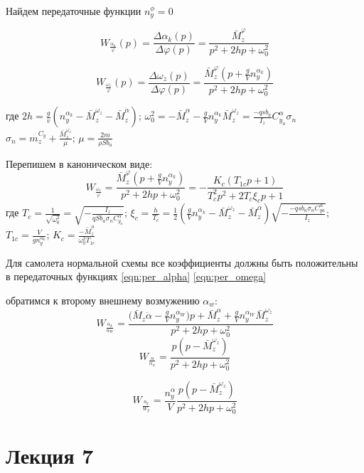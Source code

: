 \documentclass{article}
\begin{document}
Найдем передаточные функции $n_y^\phi= 0$

\begin{equation}\label{eqn:per_alpha}
W_{\frac{\alpha_k}{\varphi}}(p) = \frac{\Delta \alpha_k(p)}{\Delta \varphi(p)} = \frac{\bar{M}_z^\varphi}{p^2 + 2hp + \omega_0^2}
\end{equation}

\[
W_{\frac{\omega_z}{\varphi}} (p) = \frac{\Delta \omega_z(p)}{\Delta \varphi(p)} =\frac{\bar{M}_z^\varphi(p + \frac{g}{V} n_y^{\alpha_k})}{p^2 + 2hp + \omega_0^{2}}
\]

где $2h = \frac{g}{v}(n_y^{\alpha_k} - \bar{M}_z^{\omega_z} - \bar{M}_z^{\dot{\alpha}})$; $\omega_0^2 = - \bar{M}_z^{\alpha} - \frac{g}{V} n_y^{\alpha_k} \bar{M}_z^{\omega_z} = \frac{-qsb_a}{I_z} C_{y_a}^{\alpha} \sigma_{n}$\\
$\sigma_n = m_z^{C_y} + \frac{\bar{M}_z^{\omega_z}}{\mu}$; $\mu = \frac{2 m}{\rho S b_a}$

Перепишем в каноническом виде:
\begin{equation}\label{eqn:per_omega}
W_{\frac{\omega_z}{\varphi}} = \frac{\bar{M}_z^\varphi(p + \frac{g}{V} n_y^{\alpha_k})} {p^2 + 2hp + \omega_0^2}= %
-\frac{K_c (T_{1c} p + 1)}{T^2_c p^2 + 2 T_c \xi_c p + 1}
\end{equation}
где $T_c = \frac{1}{\sqrt{\omega_0^2}} = \sqrt{-\frac{I_z}{q S b _a \sigma_n C_{y_a}^{\alpha}}}$; $\xi_c = \frac{h}{T_c} = \frac{1}{2}( \frac{g}{V} n_y^{\alpha_k} - \bar{M}_z^{\omega_z} - \bar{M}_z^{\dot{\alpha}}) \sqrt{-\frac{-q s b_a \sigma_n C_{ya}^{\alpha}}{I_z}}$; $T_{1c} = \frac{V}{g n_y^{\alpha_k}}$; $K_c = \frac{-\bar{M}_z^\phi}{\omega_0^2 T_{1c}}$

Для самолета нормальной схемы все коэффициенты должны быть положительны в передаточных функциях \eqref{eqn:per_alpha} \eqref{eqn:per_omega}

обратимся к второму внешнему возмужению $\alpha_w$:
\[
W_{\frac{\alpha_k}{\alpha_W}} = \frac{(\bar{M}_z {\dot{\alpha} - \frac{g}{V} n_y^{\alpha_W}) p + \bar{M}_z^\alpha + \frac{g}{V} n_y^{\alpha_W} \bar{M}_z^{\omega_z} }}{p^2 + 2hp + \omega_0^2}
\]
\[
W_{\frac{\alpha}{\alpha_w}} = \frac{p(p - \bar{M}_z^{\omega_z})}{p^2 + 2hp+ \omega_0^2}
\]

\[
W_{\frac{n_y}{W_y}} = \frac{n_y^\alpha}{V} \frac{p(p - \bar{M}_z^{\omega_z})}{p^2 + 2hp + \omega_0^2}
\]
\newpage

\section{Лекция 7}
\end{document}
